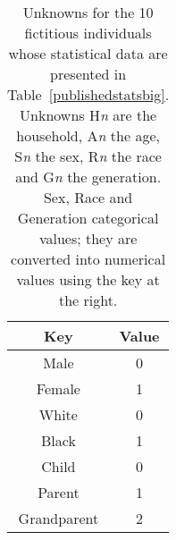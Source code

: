 \begin{table}
\caption{Unknowns for the 10 fictitious individuals whose statistical
  data are presented in Table~\ref{publishedstatsbig}. Unknowns
  H\textit{n} are the household, A\textit{n} the age, S\textit{n} the
  sex, R\textit{n} the race and G\textit{n} the generation. Sex, Race
  and Generation categorical values; they are converted into numerical
  values using the key at the right.}\label{50unknowns}
\begin{minipage}[t]{.6\textwidth}
~\\[0pt]                        %
  
\end{minipage}
\hfill
\begin{minipage}[t]{.35\textwidth}
~\\[0pt]                        %
  \begin{tabular}{c|c}
  Key & Value \\
  \hline
  \hline
  Male & 0 \\
  Female & 1 \\
  \hline
  White & 0 \\
  Black & 1 \\
  \hline
  Child & 0 \\
  Parent & 1 \\
  Grandparent & 2 \\
  \hline
  \end{tabular}
\end{minipage}
\end{table}

